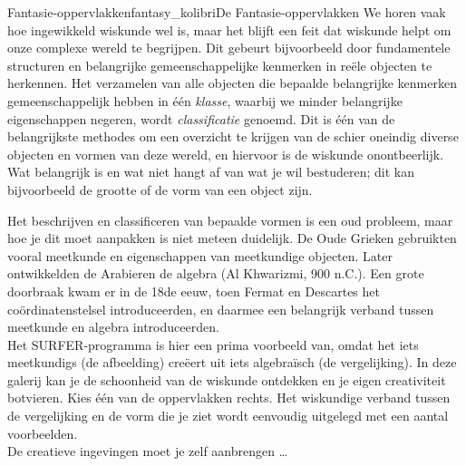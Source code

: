 \begin{surferIntroPage}{Fantasie-oppervlakken}{fantasy_kolibri}{De Fantasie-oppervlakken}
We horen vaak hoe ingewikkeld wiskunde wel is, maar het blijft een feit dat wiskunde helpt om onze complexe wereld te begrijpen. Dit gebeurt bijvoorbeeld door fundamentele structuren en belangrijke gemeenschappelijke kenmerken in re\"ele objecten te herkennen. Het verzamelen van alle objecten die bepaalde belangrijke kenmerken gemeenschappelijk hebben in \'e\'en \textit{klasse}, waarbij we minder belangrijke eigenschappen negeren, wordt \textit{classificatie} genoemd. Dit is \'e\'en van de belangrijkste methodes om een overzicht te krijgen van de schier oneindig diverse objecten en vormen van deze wereld, en hiervoor is de wiskunde onontbeerlijk. Wat belangrijk is en wat niet hangt af van wat je wil bestuderen; dit kan bijvoorbeeld de grootte of de vorm van een object zijn.
\\

\vspace{0.4cm}

Het beschrijven en classificeren van bepaalde vormen is een oud probleem, maar hoe je dit moet aanpakken is niet meteen duidelijk. De Oude Grieken gebruikten vooral meetkunde en eigenschappen van meetkundige objecten. Later ontwikkelden de Arabieren de algebra (Al Khwarizmi, 900 n.C.). Een grote doorbraak kwam er in de 18de eeuw, toen Fermat en Descartes het co\"ordinatenstelsel introduceerden, en daarmee een belangrijk verband tussen meetkunde en algebra introduceerden.
\\
\vspace{0.4cm}
Het SURFER-programma is hier een prima voorbeeld van, omdat het iets meetkundigs (de afbeelding) cre\"eert uit iets algebra\"isch (de vergelijking).
In deze galerij kan je de schoonheid van de wiskunde ontdekken en je eigen creativiteit botvieren. Kies \'e\'en van de oppervlakken rechts. Het wiskundige verband tussen de vergelijking en de vorm die je ziet wordt eenvoudig uitgelegd met een aantal voorbeelden.\\
De creatieve ingevingen moet je zelf aanbrengen \dots
\end{surferIntroPage}
